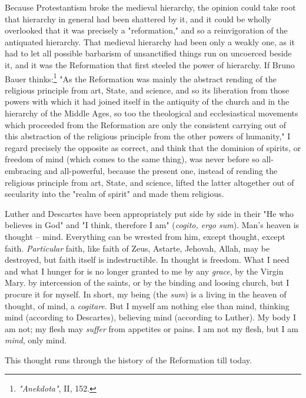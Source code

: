Because Protestantism broke the medieval hierarchy, the opinion could take 
root that hierarchy in general had been shattered by it, and it could be 
wholly overlooked that it was precisely a "{}reformation,"{} and so a 
reinvigoration of the antiquated hierarchy. That medieval hierarchy had been 
only a weakly one, as it had to let all possible barbarism of unsanctified 
things run on uncoerced beside it, and it was the Reformation that first 
steeled the power of hierarchy. If Bruno Bauer 
thinks:\footnote{\textit{"{}Anekdota"{}}, II, 152.} "{}As the Reformation was 
mainly the abstract rending of the religious principle from art, State, and 
science, and so its liberation from those powers with which it had joined 
itself in the antiquity of the church and in the hierarchy of the Middle Ages, 
so too the theological and ecclesiastical movements which proceeded from the 
Reformation are only the consistent carrying out of this abstraction of the 
religious principle from the other powers of humanity,"{} I regard precisely 
the opposite as correct, and think that the dominion of spirits, or freedom of 
mind (which comes to the same thing), was never before so all-embracing and 
all-powerful, because the present one, instead of rending the religious 
principle from art, State, and science, lifted the latter altogether out of 
secularity into the "{}realm of spirit"{} and made them religious.

Luther and Descartes have been appropriately put side by side in their "{}He 
who believes in God"{} and "{}I think, therefore I am"{} (\textit{cogito, ergo 
sum}). Man's heaven is thought -- mind. Everything can be wrested from him, 
except thought, except faith. \textit{Particular} faith, like faith of Zeus, 
Astarte, Jehovah, Allah, may be destroyed, but faith itself is indestructible. 
In thought is freedom. What I need and what I hunger for is no longer granted 
to me by any \textit{grace}, by the Virgin Mary. by intercession of the 
saints, or by the binding and loosing church, but I procure it for myself. In 
short, my being (the \textit{sum}) is a living in the heaven of thought, of 
mind, a \textit{cogitare}. But I myself am nothing else than mind, thinking 
mind (according to Descartes), believing mind (according to Luther). My body I 
am not; my flesh may \textit{suffer} from appetites or pains. I am not my 
flesh, but I am \textit{mind}, only mind.

This thought runs through the history of the Reformation till today.

